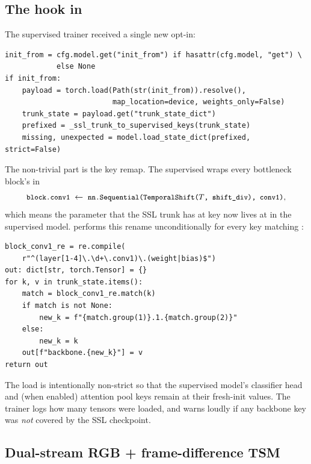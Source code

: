 \subsection{The  hook in }
\label{sec:phase3dino:initfrom}

The supervised trainer received a single new opt-in:

\begin{lstlisting}[style=py]
init_from = cfg.model.get("init_from") if hasattr(cfg.model, "get") \
            else None
if init_from:
    payload = torch.load(Path(str(init_from)).resolve(),
                         map_location=device, weights_only=False)
    trunk_state = payload.get("trunk_state_dict")
    prefixed = _ssl_trunk_to_supervised_keys(trunk_state)
    missing, unexpected = model.load_state_dict(prefixed, strict=False)
\end{lstlisting}

The non-trivial part is the key remap. The supervised
 wraps every bottleneck block's 
in
\[
\texttt{\small block.conv1} \;\leftarrow\;
\texttt{\small nn.Sequential(TemporalShift(\(T\), shift\_div), conv1)},
\]
which means the parameter that the SSL trunk has at key
 now lives at
 in the supervised model.
 performs this rename
unconditionally for every key matching
:

\begin{lstlisting}[style=py]
block_conv1_re = re.compile(
    r"^(layer[1-4]\.\d+\.conv1)\.(weight|bias)$")
out: dict[str, torch.Tensor] = {}
for k, v in trunk_state.items():
    match = block_conv1_re.match(k)
    if match is not None:
        new_k = f"{match.group(1)}.1.{match.group(2)}"
    else:
        new_k = k
    out[f"backbone.{new_k}"] = v
return out
\end{lstlisting}

The load is intentionally non-strict so that the supervised model's
classifier head and (when enabled) attention pool keys remain at their
fresh-init values. The trainer logs how many tensors were loaded, and
warns loudly if any backbone key was \emph{not} covered by the SSL
checkpoint.

\subsection{Dual-stream RGB + frame-difference TSM}
\label{sec:dual-stream-rgb-diff}

